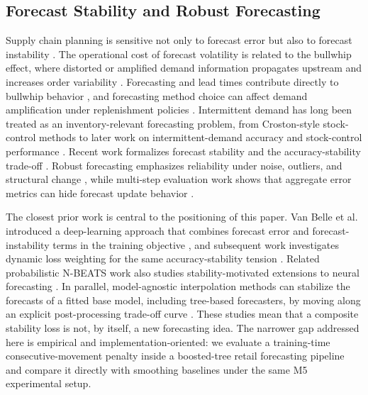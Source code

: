 \documentclass[10pt,conference]{IEEEtran}
\begin{document}
\subsection{Forecast Stability and Robust Forecasting}
Supply chain planning is sensitive not only to forecast error but also to forecast instability \cite{lee1997bullwhip,chen2000bullwhip,godahewa2025forecastStability}. The operational cost of forecast volatility is related to the bullwhip effect, where distorted or amplified demand information propagates upstream and increases order variability \cite{lee1997bullwhip}. Forecasting and lead times contribute directly to bullwhip behavior \cite{chen2000bullwhip}, and forecasting method choice can affect demand amplification under replenishment policies \cite{zhang2004forecastingBullwhip}. Intermittent demand has long been treated as an inventory-relevant forecasting problem, from Croston-style stock-control methods \cite{croston1972intermittent} to later work on intermittent-demand accuracy and stock-control performance \cite{syntetos2005accuracy,syntetos2006stockControl}. Recent work formalizes forecast stability and the accuracy-stability trade-off \cite{godahewa2025forecastStability}. Robust forecasting emphasizes reliability under noise, outliers, and structural change \cite{barrow2020robustExponentialSmoothing}, while multi-step evaluation work shows that aggregate error metrics can hide forecast update behavior \cite{strom2024forecastMetrics}.

The closest prior work is central to the positioning of this paper. Van Belle et al. introduced a deep-learning approach that combines forecast error and forecast-instability terms in the training objective \cite{vanBelle2023stability}, and subsequent work investigates dynamic loss weighting for the same accuracy-stability tension \cite{caljon2024dynamic}. Related probabilistic N-BEATS work also studies stability-motivated extensions to neural forecasting \cite{vanBelle2024probabilistic}. In parallel, model-agnostic interpolation methods can stabilize the forecasts of a fitted base model, including tree-based forecasters, by moving along an explicit post-processing trade-off curve \cite{godahewa2025forecastStability}. These studies mean that a composite stability loss is not, by itself, a new forecasting idea. The narrower gap addressed here is empirical and implementation-oriented: we evaluate a training-time consecutive-movement penalty inside a boosted-tree retail forecasting pipeline and compare it directly with smoothing baselines under the same M5 experimental setup.
\end{document}
